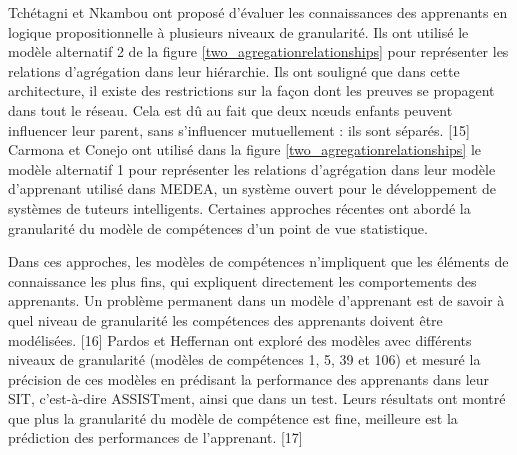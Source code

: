 Tchétagni et Nkambou ont proposé d’évaluer les connaissances des apprenants en logique propositionnelle à plusieurs niveaux de granularité. Ils ont utilisé le modèle alternatif 2 de la figure \ref{two_agregationrelationships} pour représenter les relations d'agrégation dans leur hiérarchie. Ils ont souligné que dans cette architecture, il existe des restrictions sur la façon dont les preuves se propagent dans tout le réseau. Cela est dû au fait que deux nœuds enfants peuvent influencer leur parent, sans s'influencer mutuellement : ils sont séparés. [15] \\
Carmona et Conejo ont utilisé dans la figure \ref{two_agregationrelationships} le modèle alternatif 1 pour représenter les relations d'agrégation dans leur modèle d'apprenant utilisé dans MEDEA, un système ouvert pour le développement de systèmes de tuteurs intelligents. Certaines approches récentes ont abordé la granularité du modèle de compétences d'un point de vue statistique. 

Dans ces approches, les modèles de compétences n'impliquent que les éléments de connaissance les plus fins, qui expliquent directement les comportements des apprenants. Un problème permanent dans un modèle d’apprenant est de savoir à quel niveau de granularité les compétences des apprenants doivent être modélisées. [16] Pardos et Heffernan ont exploré des modèles avec différents niveaux de granularité (modèles de compétences 1, 5, 39 et 106) et mesuré la précision de ces modèles en prédisant la performance des apprenants dans leur SIT, c'est-à-dire ASSISTment, ainsi que dans un test. Leurs résultats ont montré que plus la granularité du modèle de compétence est fine, meilleure est la prédiction des performances de l'apprenant. [17]

